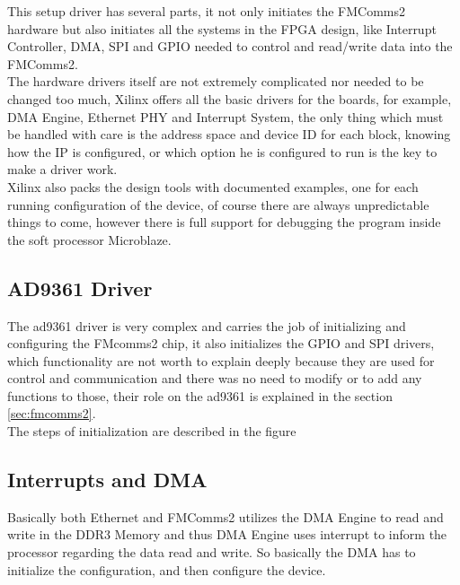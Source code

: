This setup driver has several parts, it not only initiates the FMComms2 hardware
but also initiates all the systems in the FPGA design, like Interrupt Controller,
 DMA, SPI and GPIO needed to control and read/write data into the FMComms2.\\

The hardware drivers itself are not extremely complicated nor needed to be changed
too much, Xilinx offers all the basic drivers for the boards, for example, DMA Engine,
Ethernet PHY and Interrupt System, the only thing which must be handled with care is
the address space and device ID for each block, knowing how the IP is configured,
or which option he is configured to run is the key to make a driver work.\\

Xilinx also packs the design tools with documented examples, one for each running
configuration of the device, of course there are always unpredictable things to come,
however there is full support for debugging the program inside the soft processor
Microblaze.

\subsection{AD9361 Driver}

The ad9361 driver is very complex and carries the job of initializing and configuring
the FMcomms2 chip, it also initializes the GPIO and SPI drivers, which functionality
are not worth to explain deeply because they are used for control and communication
and there was no need to modify or to add any functions to those, their role on the
ad9361 is explained in the section \ref{sec:fmcomms2}.\\



The steps of initialization are described in the figure %


\subsection{Interrupts and DMA}

Basically both Ethernet and FMComms2 utilizes the DMA Engine to read and write in
the DDR3 Memory and thus DMA Engine uses interrupt to inform the processor regarding
the data read and write. So basically the DMA has to initialize the configuration,
and then configure the device.\\

